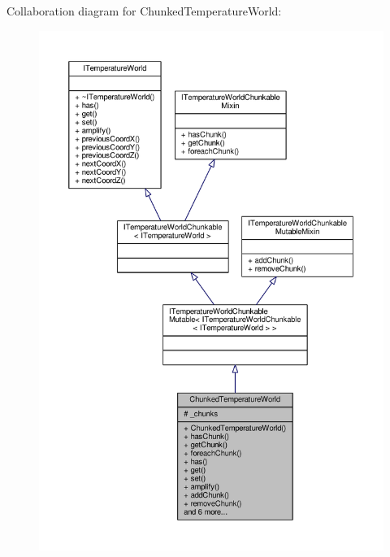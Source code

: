 Collaboration diagram for Chunked\-Temperature\-World\-:
\nopagebreak
\begin{figure}[H]
\begin{center}
\leavevmode
\includegraphics[width=350pt]{class_chunked_temperature_world__coll__graph}
\end{center}
\end{figure}
